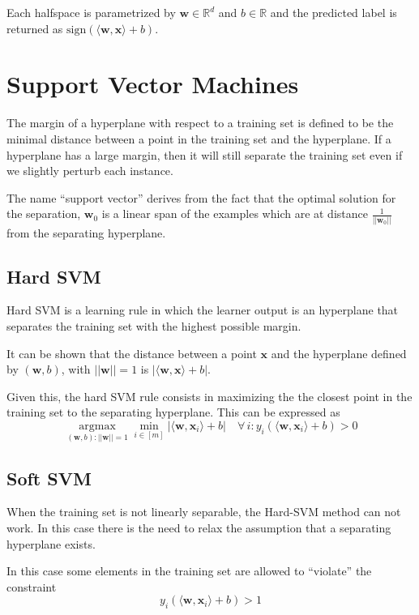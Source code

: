 \documentclass[a4paper, 11pt]{article}
\DeclareMathOperator*{\argmax}{argmax}
\begin{document}
Each halfspace is parametrized by $\mathbf{w} \in \mathbb{R}^d$ and $b \in \mathbb{R}$ and the predicted label is returned as $\text{sign} \left( \langle \mathbf{w}, \mathbf{x} \rangle + b \right)$.

\section*{Support Vector Machines}
The margin of a hyperplane with respect to a training set is defined to be the
minimal distance between a point in the training set and the hyperplane. If a
hyperplane has a large margin, then it will still separate the training set even if we slightly perturb each instance.

The name ``support vector'' derives from the fact that the optimal solution for the separation, $\mathbf{w}_0$ is a linear span of the examples which are at distance $\frac{1}{||\mathbf{w}_0||}$ from the separating hyperplane.

\subsection*{Hard SVM}
Hard SVM is a learning rule in which the learner output is an hyperplane that separates the training set with the highest possible margin.

It can be shown that the distance between a point $\mathbf{x}$ and the hyperplane defined by $(\mathbf{w}, b)$, with $||\mathbf{w}||=1$ is $|\langle \mathbf{w}, \mathbf{x} \rangle + b | $.

Given this, the hard SVM rule consists in maximizing the the closest point in the training set to the separating hyperplane. This can be expressed as
\begin{equation}
    \argmax\limits_{(\mathbf{w},b):||\mathbf{w}||=1} \min\limits_{i \in [m]} | \langle \mathbf{w}, \mathbf{x}_i \rangle + b| \quad \forall \, i : y_i \left( \langle  \mathbf{w}, \mathbf{x}_i \rangle + b \right) > 0
\end{equation}

\subsection*{Soft SVM}
When the training set is not linearly separable, the Hard-SVM method can not work. In this case there is the need to relax the assumption that a separating hyperplane exists.

In this case some elements in the training set are allowed to ``violate'' the constraint
\begin{equation}\label{eq:constraint1}
	y_i \left( \langle \mathbf{w}, \mathbf{x}_i \rangle +b \right) > 1
\end{equation}
\end{document}

